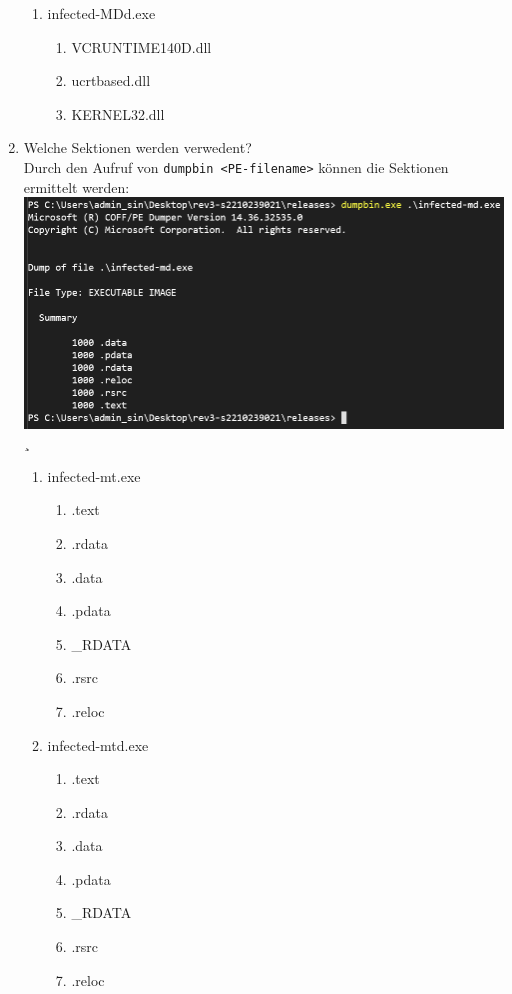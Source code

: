 \documentclass{article}
\begin{document}
\begin{enumerate}
\begin{enumerate}
			\item infected-MDd.exe
			\begin{enumerate}
				\item VCRUNTIME140D.dll
				\item ucrtbased.dll
				\item KERNEL32.dll
			\end{enumerate}
		\end{enumerate}
		\pagebreak
		\item Welche Sektionen werden verwedent?\\
		Durch den Aufruf von \texttt{dumpbin <PE-filename>} können die Sektionen ermittelt werden:\\
		\includegraphics[width=1\linewidth]{pictures/1. dumpbin md}¸
		\begin{enumerate}
			\item infected-mt.exe
			\begin{enumerate}
				\item .text
				\item .rdata
				\item .data
				\item .pdata
				\item \_RDATA
				\item .rsrc
				\item .reloc
			\end{enumerate}
			\item infected-mtd.exe
			\begin{enumerate}
				\item .text
				\item .rdata
				\item .data
				\item .pdata
				\item \_RDATA
				\item .rsrc
				\item .reloc
			\end{enumerate}

\end{enumerate}
\end{enumerate}
\end{document}
